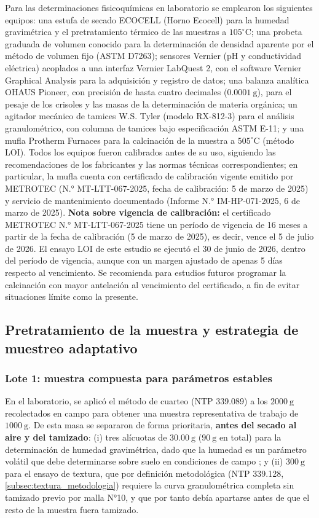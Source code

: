 \documentclass[fleqn]{jaes}
\begin{document}
Para las determinaciones fisicoquímicas en laboratorio se emplearon los siguientes equipos: una estufa de secado ECOCELL (Horno Ecocell) para la humedad gravimétrica y el pretratamiento térmico de las muestras a $105^\circ\text{C}$; una probeta graduada de volumen conocido para la determinación de densidad aparente por el método de volumen fijo (ASTM D7263); sensores Vernier (pH y conductividad eléctrica) acoplados a una interfaz Vernier LabQuest 2, con el software Vernier Graphical Analysis para la adquisición y registro de datos; una balanza analítica OHAUS Pioneer, con precisión de hasta cuatro decimales ($0.0001~\text{g}$), para el pesaje de los crisoles y las masas de la determinación de materia orgánica; un agitador mecánico de tamices W.S. Tyler (modelo RX-812-3) para el análisis granulométrico, con columna de tamices bajo especificación ASTM E-11; y una mufla Protherm Furnaces para la calcinación de la muestra a $505^\circ\text{C}$ (método LOI). Todos los equipos fueron calibrados antes de su uso, siguiendo las recomendaciones de los fabricantes y las normas técnicas correspondientes; en particular, la mufla cuenta con certificado de calibración vigente emitido por METROTEC (N.° MT-LTT-067-2025, fecha de calibración: 5 de marzo de 2025) y servicio de mantenimiento documentado (Informe N.° IM-HP-071-2025, 6 de marzo de 2025). \textbf{Nota sobre vigencia de calibración:} el certificado METROTEC N.° MT-LTT-067-2025 tiene un período de vigencia de 16 meses a partir de la fecha de calibración (5 de marzo de 2025), es decir, vence el 5 de julio de 2026. El ensayo LOI de este estudio se ejecutó el 30 de junio de 2026, dentro del período de vigencia, aunque con un margen ajustado de apenas 5 días respecto al vencimiento. Se recomienda para estudios futuros programar la calcinación con mayor antelación al vencimiento del certificado, a fin de evitar situaciones límite como la presente.

\subsection{Pretratamiento de la muestra y estrategia de muestreo adaptativo}

\subsubsection{Lote 1: muestra compuesta para parámetros estables}\label{subsec:lote1}

En el laboratorio, se aplicó el método de cuarteo (NTP 339.089) \cite{INACAL2014} a los $2000~\text{g}$ recolectados en campo para obtener una muestra representativa de trabajo de $1000~\text{g}$. De esta masa se separaron de forma prioritaria, \textbf{antes del secado al aire y del tamizado}: (i) tres alícuotas de $30.00~\text{g}$ ($90~\text{g}$ en total) para la determinación de humedad gravimétrica, dado que la humedad es un parámetro volátil que debe determinarse sobre suelo en condiciones de campo \cite{INACAL2019}; y (ii) $300~\text{g}$ para el ensayo de textura, que por definición metodológica (NTP 339.128, \cref{subsec:textura_metodologia}) requiere la curva granulométrica completa sin tamizado previo por malla N°10, y que por tanto debía apartarse antes de que el resto de la muestra fuera tamizado.
\end{document}
